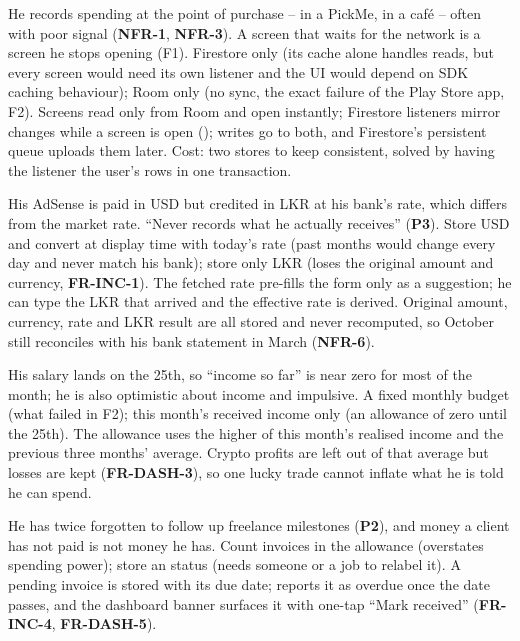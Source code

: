 \documentclass[11pt,a4paper]{article}
\newcommand{\req}[1]{\textsf{\textbf{\color{pfgreendark}#1}}}
\newcommand{\prob}[1]{\textsf{\textbf{\color{pfamberdark}#1}}}
\begin{document}
{He records spending at the point of purchase -- in a PickMe, in a caf\'e -- often with poor signal (\req{NFR-1}, \req{NFR-3}). A screen that waits for the network is a screen he stops opening (F1).}
{Firestore only (its cache alone handles reads, but every screen would need its own listener and the UI would depend on SDK caching behaviour); Room only (no sync, the exact failure of the Play Store app, F2).}
{Screens read only from Room and open instantly; Firestore listeners mirror changes while a screen is open (); writes go to both, and Firestore's persistent queue uploads them later. Cost: two stores to keep consistent, solved by having the listener  the user's rows in one transaction.}

{His AdSense is paid in USD but credited in LKR at his bank's rate, which differs from the market rate. ``Never records what he actually receives'' (\prob{P3}).}
{Store USD and convert at display time with today's rate (past months would change every day and never match his bank); store only LKR (loses the original amount and currency, \req{FR-INC-1}).}
{The fetched rate pre-fills the form only as a suggestion; he can type the LKR that arrived and the effective rate is derived. Original amount, currency, rate and LKR result are all stored and never recomputed, so October still reconciles with his bank statement in March (\req{NFR-6}).}

{His salary lands on the 25th, so ``income so far'' is near zero for most of the month; he is also optimistic about income and impulsive.}
{A fixed monthly budget (what failed in F2); this month's received income only (an allowance of zero until the 25th).}
{The allowance uses the higher of this month's realised income and the previous three months' average. Crypto profits are left out of that average but losses are kept (\req{FR-DASH-3}), so one lucky trade cannot inflate what he is told he can spend.}

{He has twice forgotten to follow up freelance milestones (\prob{P2}), and money a client has not paid is not money he has.}
{Count invoices in the allowance (overstates spending power); store an  status (needs someone or a job to relabel it).}
{A pending invoice is stored with its due date;  reports it as overdue once the date passes, and the dashboard banner surfaces it with one-tap ``Mark received'' (\req{FR-INC-4}, \req{FR-DASH-5}).}
\end{document}
